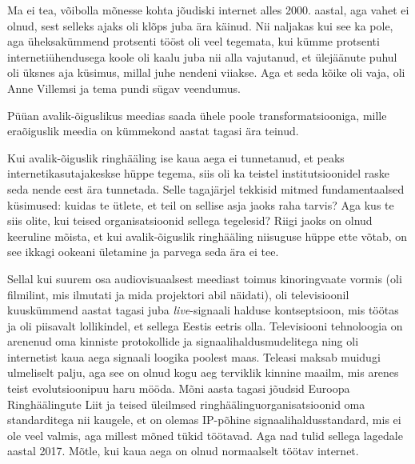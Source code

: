 
Ma ei tea, võibolla mõnesse kohta jõudiski internet alles 2000. aastal, aga 
vahet ei olnud, sest selleks ajaks oli klõps juba 
ära käinud. Nii naljakas kui see ka pole, aga üheksakümmend protsenti tööst oli 
veel tegemata, kui kümme protsenti internetiühendusega koole oli kaalu juba 
nii alla vajutanud, et ülejäänute puhul oli üksnes aja küsimus, millal juhe nendeni 
viiakse. Aga et seda kõike oli vaja, oli Anne Villemsi ja tema pundi sügav veendumus. 


Püüan avalik-õiguslikus meedias saada ühele poole transformatsiooniga, mille eraõiguslik meedia on kümmekond aastat tagasi ära teinud.


Kui avalik-õiguslik ringhääling ise kaua aega ei 
tunnetanud, et peaks internetikasutajakeskse hüppe tegema, 
siis oli ka teistel institutsioonidel raske seda nende eest ära 
tunnetada. Selle tagajärjel tekkisid mitmed fundamentaalsed küsimused: 
kuidas te ütlete, et teil on sellise asja jaoks raha tarvis? Aga kus te siis 
olite, kui teised organisatsioonid sellega tegelesid? Riigi jaoks on olnud keeruline 
mõista, et kui avalik-õiguslik ringhääling niisuguse hüppe ette võtab, on see
ikkagi ookeani ületamine ja parvega seda ära ei tee.


Sellal kui suurem osa audiovisuaalsest meediast toimus kinoringvaate vormis (oli 
filmilint, mis ilmutati ja mida projektori abil näidati), oli 
televisioonil kuuskümmend aastat tagasi juba \emph{live}-signaali halduse kontseptsioon, mis töötas ja oli 
piisavalt lollikindel, et sellega Eestis eetris olla. 
Televisiooni tehnoloogia on arenenud oma kinniste protokollide ja 
signaalihaldusmudelitega ning oli internetist kaua aega signaali 
loogika poolest maas. Teleasi maksab muidugi ulmeliselt palju, aga 
see on olnud kogu aeg terviklik kinnine maailm, mis arenes teist 
evolutsioonipuu haru mööda. Mõni aasta tagasi jõudsid Euroopa 
Ringhäälingute Liit ja teised üleilmsed ringhäälinguorganisatsioonid oma standarditega nii kaugele, et on olemas IP-põhine 
signaalihaldusstandard, mis ei ole veel valmis, aga millest mõned tükid 
töötavad. Aga nad tulid sellega lagedale aastal 2017. Mõtle, kui kaua aega on olnud 
normaalselt töötav internet.

